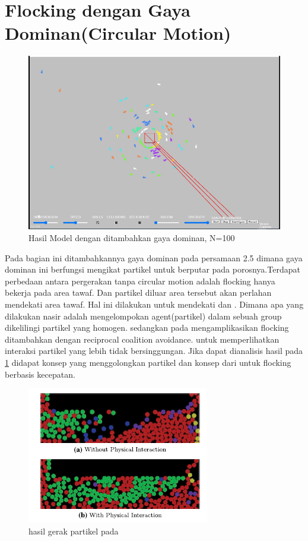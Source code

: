 \section{Flocking dengan Gaya Dominan(Circular Motion)}%

\begin{figure}
\centering
\includegraphics[scale=0.6]{gambar/gambar3tawafflocking25}
\caption{Hasil Model dengan ditambahkan gaya dominan, N=100}
\label{fig:2grafikmodel4gayadengan dominanforce}
\end{figure}
\hspace{0.6cm} Pada bagian ini ditambahkannya gaya dominan pada persamaan 2.5 dimana gaya dominan ini berfungsi mengikat partikel untuk berputar pada porosnya.Terdapat perbedaan antara pergerakan tanpa circular motion adalah flocking hanya bekerja pada area tawaf. Dan partikel diluar area tersebut akan perlahan mendekati area tawaf. Hal ini dilakukan untuk mendekati \citep{Nasir2016} dan \citep{Kim2014}. Dimana apa yang dilakukan nasir adalah mengelompokan agent(partikel) dalam sebuah group dikelilingi partikel yang homogen. sedangkan pada \citep{Kim2014} mengamplikasikan flocking ditambahkan dengan reciprocal coalition avoidance. untuk memperlihatkan interaksi partikel yang lebih tidak bersinggungan. Jika dapat dianalisis hasil pada \ref{fig:2grafikmodel4gayadengan dominanforce} didapat konsep \citep{Nasir2016} yang menggolongkan partikel dan konsep dari \citep{Kim2014} untuk flocking berbasis kecepatan.
\begin{figure}
\centering
\includegraphics[scale=0.6]{gambar/Kim2014}
\caption{hasil gerak partikel pada \citep{Kim2014}}
\label{fig:figkim2014}
\end{figure}
